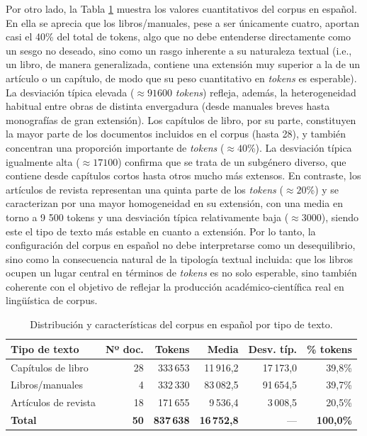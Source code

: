 Por otro lado, la Tabla \ref{tab:es_corpus} muestra los valores cuantitativos del corpus en español. En ella se aprecia que los libros/manuales, pese a ser únicamente cuatro, aportan casi el 40\% del total de tokens, algo que no debe entenderse directamente como un sesgo no deseado, sino como un rasgo inherente a su naturaleza textual (i.e., un libro, de manera generalizada, contiene una extensión muy superior a la de un artículo o un capítulo, de modo que su peso cuantitativo en \textit{tokens} es esperable). La desviación típica elevada ($\approx91 600$ \textit{tokens}) refleja, además, la heterogeneidad habitual entre obras de distinta envergadura (desde manuales breves hasta monografías de gran extensión). Los capítulos de libro, por su parte, constituyen la mayor parte de los documentos incluidos en el corpus (hasta 28), y también concentran una proporción importante de \textit{tokens} ($\approx40$\%). La desviación típica igualmente alta ($\approx17 100$) confirma que se trata de un subgénero diverso, que contiene desde capítulos cortos hasta otros mucho más extensos. En contraste, los artículos de revista representan una quinta parte de los \textit{tokens} ($\approx20$\%) y se caracterizan por una mayor homogeneidad en su extensión, con una media en torno a 9 500 tokens y una desviación típica relativamente baja ($\approx3 000$), siendo este el tipo de texto más estable en cuanto a extensión. Por lo tanto, la configuración del corpus en español no debe interpretarse como un desequilibrio, sino como la consecuencia natural de la tipología textual incluida: que los libros ocupen un lugar central en términos de \textit{tokens} es no solo esperable, sino también coherente con el objetivo de reflejar la producción académico-científica real en lingüística de corpus.

\begin{table}[H]
\centering
\fontsize{10}{12}\selectfont
\begin{tabular}{lrrrrr}
\toprule
Tipo de texto & Nº doc. & Tokens & Media & Desv. típ. & \% tokens \\
\midrule
Capítulos de libro & 28 & 333\,653 & 11\,916,2 & 17\,173,0 & 39,8\% \\
Libros/manuales    &  4 & 332\,330 & 83\,082,5 & 91\,654,5 & 39,7\% \\
Artículos de revista & 18 & 171\,655 &  9\,536,4 &  3\,008,5 & 20,5\% \\
\rowcolor{gray!20}\textbf{Total} & \textbf{50} & \textbf{837\,638} & \textbf{16\,752,8} & — & \textbf{100,0\%} \\
\bottomrule
\end{tabular}
\caption{Distribución y características del corpus en español por tipo de texto.}
\label{tab:es_corpus}
\end{table}

